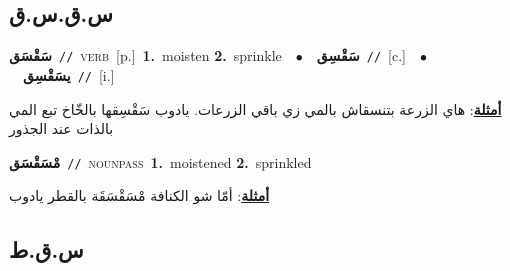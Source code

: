 \documentclass[10pt,a4paper,twoside]{article} %
\begin{document}
\begin{multicols}{2}
\vspace{-3mm}
\subsection*{\color{blue}\foreignlanguage{arabic}{س.ق.س.ق}\color{blue}{}} 

{\setlength\topsep{0pt}\textbf{\foreignlanguage{arabic}{سَقْسَق}}\ {\color{gray}\texttt{//}\color{black}}\ \textsc{verb}\ [p.]\ \textbf{1.}~moisten  \textbf{2.}~sprinkle\ \ $\bullet$\ \ \setlength\topsep{0pt}\textbf{\foreignlanguage{arabic}{سَقْسِق}}\ {\color{gray}\texttt{//}\color{black}}\ [c.]\ \ $\bullet$\ \ \setlength\topsep{0pt}\textbf{\foreignlanguage{arabic}{يسَقْسِق}}\ {\color{gray}\texttt{//}\color{black}}\ [i.]\  \begin{flushright}\color{gray}\foreignlanguage{arabic}{\textbf{\underline{\foreignlanguage{arabic}{أمثلة}}}: هاي الزرعة بتنسقاش بالمي زي باقي الزرعات. يادوب سَقْسِقها بالخّاخ تبع المي بالذات عند الجذور}\end{flushright}\color{black}} \vspace{2mm}

{\setlength\topsep{0pt}\textbf{\foreignlanguage{arabic}{مْسَقْسَق}}\ {\color{gray}\texttt{//}\color{black}}\ \textsc{noun\textunderscore pass}\ \textbf{1.}~moistened  \textbf{2.}~sprinkled\  \begin{flushright}\color{gray}\foreignlanguage{arabic}{\textbf{\underline{\foreignlanguage{arabic}{أمثلة}}}: أمّا شو الكنافة مْسَقْسَقَة بالقطر يادوب}\end{flushright}\color{black}} \vspace{2mm}

\vspace{-3mm}
\subsection*{\color{blue}\foreignlanguage{arabic}{س.ق.ط}\color{blue}{}} 


\end{multicols}
\end{document}
